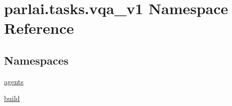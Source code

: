 \hypertarget{namespaceparlai_1_1tasks_1_1vqa__v1}{}\section{parlai.\+tasks.\+vqa\+\_\+v1 Namespace Reference}
\label{namespaceparlai_1_1tasks_1_1vqa__v1}
\subsection*{Namespaces}
\begin{DoxyCompactItemize}
\item 
 \hyperlink{namespaceparlai_1_1tasks_1_1vqa__v1_1_1agents}{agents}
\item 
 \hyperlink{namespaceparlai_1_1tasks_1_1vqa__v1_1_1build}{build}
\end{DoxyCompactItemize}
